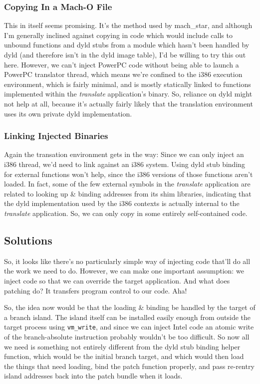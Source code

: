 \documentclass[english]{article}
\begin{document}
\subsubsection{Copying In a Mach-O File}
This in itself seems promising. It's the method used by mach\_star, and although I'm generally inclined against copying in code which would include calls to unbound functions and dyld stubs from a module which hasn't been handled by dyld (and therefore isn't in the dyld image table), I'd be willing to try this out here. However, we can't inject PowerPC code without being able to launch a PowerPC translator thread, which means we're confined to the i386 execution environment, which is fairly minimal, and is mostly statically linked to functions implemented within the \textsl{translate} application's binary. So, reliance on dyld might not help at all, because it's actually fairly likely that the translation environment uses its own private dyld implementation.

\subsubsection{Linking Injected Binaries}
Again the transation environment gets in the way: Since we can only inject an i386 thread, we'd need to link against an i386 system. Using dyld stub binding for external functions won't help, since the i386 versions of those functions aren't loaded. In fact, some of the few external symbols in the \textsl{translate} application are related to looking up \& binding addresses from its shim libraries, indicating that the dyld implementation used by the i386 contexts is actually internal to the \textsl{translate} application. So, we can only copy in some entirely self-contained code.


\subsection{Solutions}
So, it looks like there's no particularly simple way of injecting code that'll do all the work we need to do. However, we can make one important assumption: we inject code so that we can override the target application. And what does patching do? It transfers program control to our code. Aha!

So, the idea now would be that the loading \& binding be handled by the target of a branch island. The island itself can be installed easily enough from outside the target process using \texttt{vm\_write}, and since we can inject Intel code an atomic write of the branch-absolute instruction probably wouldn't be too difficult. So now all we need is something not entirely different from the dyld stub binding helper function, which would be the initial branch target, and which would then load the things that need loading, bind the patch function properly, and pass re-rentry island addresses back into the patch bundle when it loads.
\end{document}
